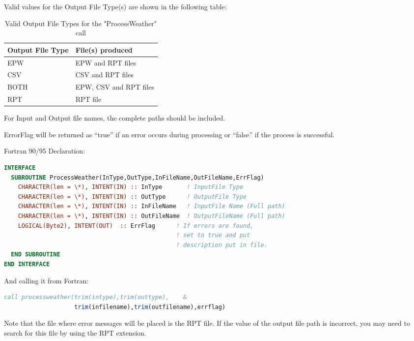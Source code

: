 Valid values for the Output File Type(s) are shown in the following table:

\begin{longtable}[c]{@{}ll@{}}
\caption{Valid Output File Types for the "ProcessWeather" call \protect \label{table:valid-output-file-types-for}}\\
\toprule 
Output File Type & File(s) produced \tabularnewline \midrule
\endhead
EPW & EPW and RPT files \tabularnewline
CSV & CSV and RPT files \tabularnewline
BOTH & EPW, CSV and RPT files \tabularnewline
RPT & RPT file \tabularnewline
\bottomrule
\end{longtable}

For Input and Output file names, the complete paths should be included.

ErrorFlag will be returned as ``true'' if an error occurs during processing or ``false'' if the process is successful.

Fortran 90/95 Declaration:

\begin{lstlisting}[language=Fortran]
INTERFACE
  SUBROUTINE ProcessWeather(InType,OutType,InFileName,OutFileName,ErrFlag)
    CHARACTER(len = \*), INTENT(IN) :: InType       ! InputFile Type
    CHARACTER(len = \*), INTENT(IN) :: OutType      ! OutputFile Type
    CHARACTER(len = \*), INTENT(IN) :: InFileName   ! InputFile Name (Full path)
    CHARACTER(len = \*), INTENT(IN) :: OutFileName  ! OutputFileName (Full path)
    LOGICAL(Byte2), INTENT(OUT)  :: ErrFlag      ! If errors are found,
                                                 ! set to true and put
                                                 ! description put in file.
  END SUBROUTINE
END INTERFACE
\end{lstlisting}

And calling it from Fortran:

\begin{lstlisting}[language=Fortran]
call processweather(trim(intype),trim(outtype),    &
                    trim(infilename),trim(outfilename),errflag)
\end{lstlisting}

Note that the file where error messages will be placed is the RPT file. If the value of the output file path is incorrect, you may need to search for this file by using the RPT extension.
